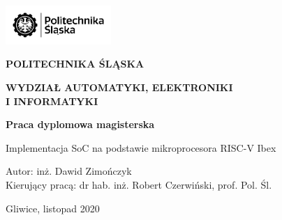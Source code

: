 \documentclass[11pt,a4paper]{article}
\begin{document}
	\date{}
\begin{center}
	\centering

\includegraphics[width=4cm]{./rysunki/logo_3.jpg}
\\
\vspace{1.5cm}
 
\textbf{\Large POLITECHNIKA ŚLĄSKA}
\\
\vspace{0.5cm}
 
\textbf{\Large WYDZIAŁ AUTOMATYKI, ELEKTRONIKI}
\\
\vspace{0.1cm}
\textbf{\Large I INFORMATYKI}
\\
\vspace{0.5cm}


\vspace{3cm}
 
\textbf{\LARGE  Praca dyplomowa magisterska}
\\
\vspace{2cm}

\Large Implementacja SoC na podstawie mikroprocesora RISC-V Ibex
\vspace{3cm}

\begin{flushleft}

\Large Autor: inż. Dawid Zimończyk
\\
\Large Kierujący pracą: dr hab. inż. Robert Czerwiński, prof. Pol. Śl.
\\

\end{flushleft}
 \vspace{2.5cm}
\Large Gliwice, listopad 2020


\end{center}
\thispagestyle{empty}


\newpage

\thispagestyle{empty}

\begin{center}

\newpage
\end{center}
\setcounter{page}{3}
\large\tableofcontents 

\newpage
\listoffigures
\end{document}
